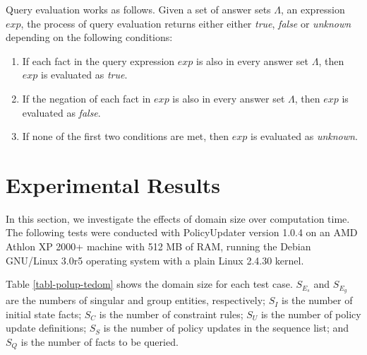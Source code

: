 \documentclass[11pt]{report}
\begin{document}

        Query evaluation works as follows. Given a set of answer sets
        $\Lambda$, an expression $exp$, the process of query evaluation returns
        either either {\em true}, {\em false} or {\em unknown} depending on the
        following conditions:

        \begin{enumerate}
          \item
            If each fact in the query expression $exp$ is also in every answer
            set $\Lambda$, then $exp$ is evaluated as {\em true}.

          \item
            If the negation of each fact in $exp$ is also in every answer set
            $\Lambda$, then $exp$ is evaluated as {\em false}.

          \item
            If none of the first two conditions are met, then $exp$ is
            evaluated as {\em unknown}.
        \end{enumerate}

    \section{Experimental Results}
      \label{sect-polup-exper}

      In this section, we investigate the effects of domain size over
      computation time. The following tests  were conducted with PolicyUpdater
      version 1.0.4 on an AMD Athlon XP 2000+ machine with 512 MB of RAM,
      running the Debian GNU/Linux 3.0r5 operating system with a plain
      Linux 2.4.30 kernel.

      Table \ref{tabl-polup-tedom} shows the domain size for each test case.
      $S_{E_{s}}$ and $S_{E_{g}}$ are the numbers of singular and group
      entities, respectively; $S_{I}$ is the number of initial state facts;
      $S_{C}$ is the number of constraint rules; $S_{U}$ is the number of
      policy update definitions; $S_{S}$ is the number of policy updates in
      the sequence list; and $S_{Q}$ is the number of facts to be queried.
\end{document}
